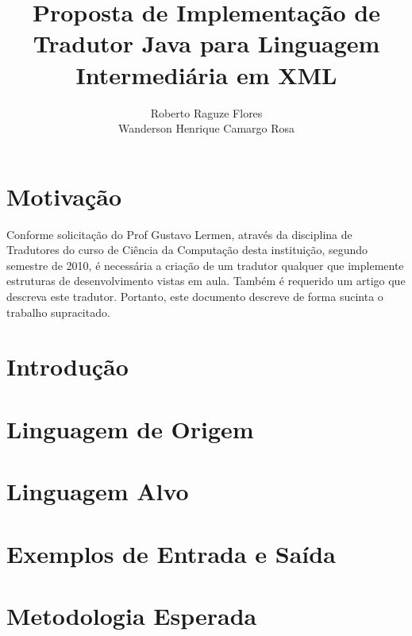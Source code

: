 \documentclass{article}
\title{Proposta de Implementação de Tradutor Java para Linguagem Intermediária
em XML}
\author{Roberto Raguze Flores\inst{1}\\Wanderson Henrique Camargo Rosa\inst{1}}
\begin{document}
\maketitle{}

\section{Motivação}

Conforme solicitação do Prof Gustavo Lermen, através da disciplina de Tradutores
do curso de Ciência da Computação desta instituição, segundo semestre de 2010,
é necessária a criação de um tradutor qualquer que implemente estruturas de 
desenvolvimento vistas em aula. Também é requerido um artigo que descreva este
tradutor. Portanto, este documento descreve de forma sucinta o trabalho
supracitado.

\section{Introdução}

\section{Linguagem de Origem}

\section{Linguagem Alvo}

\section{Exemplos de Entrada e Saída}

\section{Metodologia Esperada}
\end{document}
